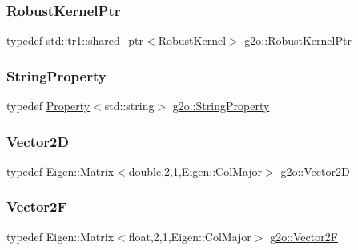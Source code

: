 \subsubsection{\texorpdfstring{Robust\+Kernel\+Ptr}{RobustKernelPtr}}
{\footnotesize\ttfamily typedef std\+::tr1\+::shared\+\_\+ptr$<$\mbox{\hyperlink{classg2o_1_1_robust_kernel}{Robust\+Kernel}}$>$ \mbox{\hyperlink{namespaceg2o_a0802a5e01a6b1861ae01013220dec6ac}{g2o\+::\+Robust\+Kernel\+Ptr}}}

\mbox{\label{namespaceg2o_a40c5b0f5bf1dd1e5b9c25c20fcf43920}} 
\subsubsection{\texorpdfstring{String\+Property}{StringProperty}}
{\footnotesize\ttfamily typedef \mbox{\hyperlink{classg2o_1_1_property}{Property}}$<$std\+::string$>$ \mbox{\hyperlink{namespaceg2o_a40c5b0f5bf1dd1e5b9c25c20fcf43920}{g2o\+::\+String\+Property}}}

\mbox{\label{namespaceg2o_a98731c1a538fbbbb105bc81434ebdecb}} 
\subsubsection{\texorpdfstring{Vector2D}{Vector2D}}
{\footnotesize\ttfamily typedef Eigen\+::\+Matrix$<$double,2,1,Eigen\+::\+Col\+Major$>$ \mbox{\hyperlink{namespaceg2o_a98731c1a538fbbbb105bc81434ebdecb}{g2o\+::\+Vector2D}}}

\mbox{\label{namespaceg2o_ab48f53e68ad9d381fcad63c4901af2e2}} 
\subsubsection{\texorpdfstring{Vector2F}{Vector2F}}
{\footnotesize\ttfamily typedef Eigen\+::\+Matrix$<$float,2,1,Eigen\+::\+Col\+Major$>$ \mbox{\hyperlink{namespaceg2o_ab48f53e68ad9d381fcad63c4901af2e2}{g2o\+::\+Vector2F}}}

\mbox{\label{namespaceg2o_affca5cbeca977d670b96298de84c5d2c}} 
